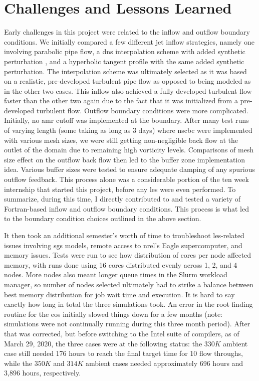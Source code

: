 \section{Challenges and Lessons Learned}
Early challenges in this project were related to the inflow and outflow boundary conditions. We initially compared a few different jet inflow strategies, namely one involving parabolic pipe flow, a \gls{dns} interpolation scheme with added synthetic perturbation \cite{}, and a hyperbolic tangent profile with the same added synthetic perturbation. The interpolation scheme was ultimately selected as it was based on a realistic, pre-developed turbulent pipe flow \cite{} as opposed to being modeled as in the other two cases. This inflow also achieved a fully developed turbulent flow faster than the other two again due to the fact that it was initialized from a pre-developed turbulent flow. Outflow boundary conditions were more complicated. Initially, no \gls{amr} cutoff was implemented at the boundary. After many test runs of varying length (some taking as long as 3 days) where \gls{nscbc} were implemented \cite{} with various mesh sizes, we were still getting non-negligible back flow at the outlet of the domain due to remaining high vorticity levels. Comparisons of mesh size effect on the outflow back flow then led to the buffer zone implementation idea. Various buffer sizes were tested to ensure adequate damping of any spurious outflow feedback. This process alone was a considerable portion of the ten week internship that started this project, before any \gls{les} were even performed. To summarize, during this time, I directly contributed to and tested a variety of Fortran-based inflow and outflow boundary conditions. This process is what led to the boundary condition choices outlined in the above section.

It then took an additional semester's worth of time to troubleshoot \gls{les}-related issues involving \gls{sgs} models, remote access to \gls{nrel}'s Eagle supercomputer, and memory issues. Tests were run to see how distribution of cores per node affected memory, with runs done using 16 cores distributed evenly across 1, 2, and 4 nodes. More nodes also meant longer queue times in the Slurm workload manager, so number of nodes selected ultimately had to strike a balance between best memory distribution for job wait time and execution. It is hard to say exactly how long in total the three simulations took. An error in the root finding routine for the \gls{eos} initially slowed things down for a few months (note: simulations were not continually running during this three month period). After that was corrected, but before switching to the Intel suite of compilers, as of March 29, 2020, the three cases were at the following status: the $330 K$ ambient case still needed 176 hours to reach the final target time for 10 flow throughs, while the $350 K$ and $314 K$ ambient cases needed approximately 696 hours and 3,896 hours, respectively. 


